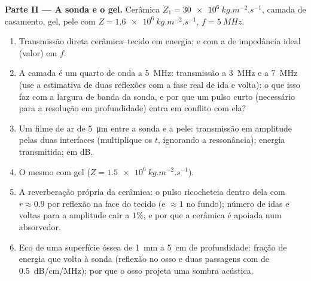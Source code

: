 \begin{problem}
\medskip
\noindent\textbf{Parte II --- A sonda e o gel.}
Cerâmica $Z_1 = \qty{30e6}{kg.m^{-2}.s^{-1}}$, camada de casamento, gel, pele com $Z =
\qty{1.6e6}{kg.m^{-2}.s^{-1}}$, $f = \qty{5}{MHz}$.
\begin{enumerate}[resume]
  \item Transmissão direta cerâmica--tecido em energia; e com a
         de impedância ideal (valor) em $f$.
  \item A camada é um quarto de onda a \qty{5}{MHz}: transmissão
        a \qty{3}{MHz} e a \qty{7}{MHz} (use a estimativa de duas reflexões
        com a fase real de ida e volta): o que isso faz com a
        largura de banda da sonda, e por que um pulso curto (necessário para a
        resolução em profundidade) entra em conflito com ela?
  \item Um filme de ar de \qty{5}{\micro m} entre a sonda e a pele: transmissão
        em amplitude pelas duas interfaces (multiplique os $t$,
        ignorando a ressonância); energia transmitida; em dB.
  \item O mesmo com gel ($Z = \qty{1.5e6}{kg.m^{-2}.s^{-1}}$).
  \item A reverberação própria da cerâmica: o pulso ricocheteia dentro
        dela com $r \approx 0.9$ por reflexão na face do tecido
        (e $\approx 1$ no fundo); número de idas e voltas para a
        amplitude cair a $1\%$, e por que a cerâmica é apoiada num
        absorvedor.
  \item Eco de uma superfície óssea de \qty{1}{mm} a \qty{5}{cm} de profundidade: fração
        de energia que volta à sonda (reflexão no osso e duas
        passagens com  de \qty{0.5}{dB/cm/MHz}); por que o osso projeta uma
        sombra acústica.
\end{enumerate}


\end{problem}
